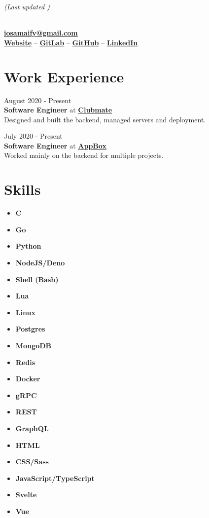 \documentclass[letterpaper, 10pt]{article}
\author{Osama Muhammad}
\date{\today}
\makeatletter
\renewcommand{\maketitle}{
	\hfill{\small\textit{(Last updated \thedate)}}
	\vspace{1em}
	\begin{center}
		\par{\huge\bfseries{\theauthor}}
		\vspace{0.7em}\\
		\href{mailto:iosamaify@gmail.com}{\textbf{iosamaify@gmail.com}}
		\vspace{0.7em}\\
		\href{https://osamai.gitlab.io}{\textbf{Website}} --
		\href{https://gitlab.com/osamai}{\textbf{GitLab}} --
		\href{https://github.com/osamai}{\textbf{GitHub}} --
		\href{https://www.linkedin.com/in/iosama}{\textbf{LinkedIn}}
	\end{center}
}
\newcommand{\hr}{\par{\vspace{-.3\ht\strutbox}\noindent\hrulefill\par}}
\makeatother
\begin{document}
\maketitle

\hr

\section{Work Experience}

\hfill{\footnotesize{August 2020 - Present}}\\
\textbf{Software Engineer} at \href{https://www.clubmate-sports.co.uk}{\textbf{Clubmate}}\\
\vspace{1em}
Designed and built the backend, managed servers and deployment.
\vspace{0.3cm}

\hfill{\footnotesize{July 2020 - Present}}\\
\textbf{Software Engineer} at \href{https://www.app-box.co.uk}{\textbf{AppBox}}\\
\vspace{1em}
Worked mainly on the backend for multiple projects.
\vspace{0.3cm}

\vspace{0.3cm}
\hr

\section{Skills}

\begin{multicols}{3}
	\begin{itemize}
		\item \textbf{C}
		\item \textbf{Go}
		\item \textbf{Python}
		\item \textbf{NodeJS/Deno}
		\item \textbf{Shell (Bash)}
		\item \textbf{Lua}
		\item \textbf{Linux}
		\item \textbf{Postgres}
		\item \textbf{MongoDB}
		\item \textbf{Redis}
		\item \textbf{Docker}
		\item \textbf{gRPC}
		\item \textbf{REST}
		\item \textbf{GraphQL}
		\item \textbf{HTML}
		\item \textbf{CSS/Sass}
		\item \textbf{JavaScript/TypeScript}
		\item \textbf{Svelte}
		\item \textbf{Vue}
	\end{itemize}
\end{multicols}
\end{document}
